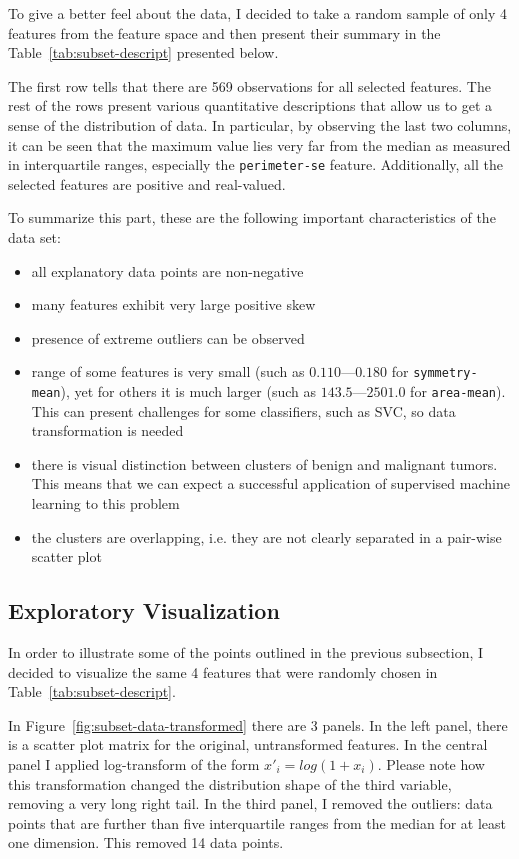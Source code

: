\documentclass[10pt, a4paper]{article}
\begin{document}
To give a better feel about the data, I decided to take a random sample of only 4 features from the feature space and then present their summary in the Table~\ref{tab:subset-descript} presented below.

The first row tells that there are 569 observations for all selected features. The rest of the rows present various quantitative descriptions that allow us to get a sense of the distribution of data.
In particular, by observing the last two columns, it can be seen that the maximum value lies very far from the median as measured in interquartile ranges, especially the \texttt{perimeter-se} feature. Additionally, all the selected features are positive and real-valued.



To summarize this part, these are the following important characteristics of the data set:
\begin{itemize}
	\item all explanatory data points are non-negative
	\item many features exhibit very large positive skew
	\item presence of extreme outliers can be observed
	\item range of some features is very small (such as $0.110$---$0.180$ for \texttt{symmetry-mean}), yet for others it is much larger (such as $143.5$---$2501.0$ for \texttt{area-mean}). This can present challenges for some classifiers, such as SVC, so data transformation is needed
	\item there is visual distinction between clusters of benign and malignant tumors. This means that we can expect a successful application of supervised machine learning to this problem
	\item the clusters are overlapping, i.e. they are not clearly separated in a pair-wise scatter plot
\end{itemize}

\subsection{Exploratory Visualization}
\label{subsec:exploratory-visualization}

In order to illustrate some of the points outlined in the previous subsection, I decided to visualize the same 4 features that were randomly chosen in Table~\ref{tab:subset-descript}.

In Figure~\ref{fig:subset-data-transformed} there are 3 panels. In the left panel, there is a scatter plot matrix for the original, untransformed features. In the central panel I applied log-transform of the form $x'_i=log(1+x_i)$. Please note how this transformation changed the distribution shape of the third variable, removing a very long right tail. In the third panel, I removed the outliers: data points that are further than five interquartile ranges from the median for at least one dimension. This removed 14 data points.
\end{document}
